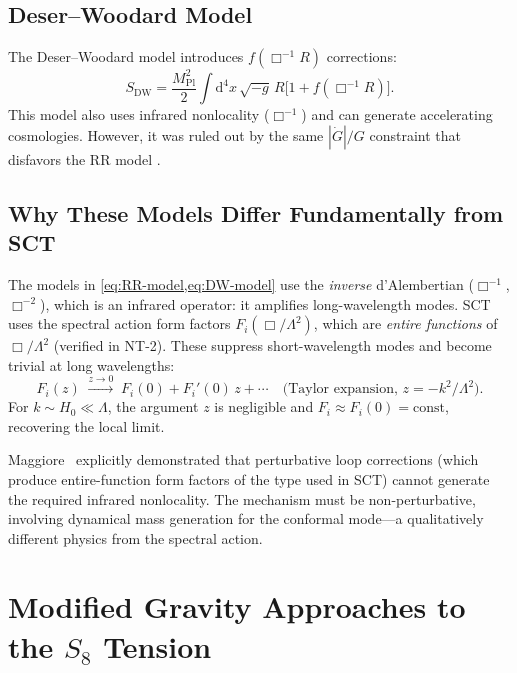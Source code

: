 \documentclass[11pt,a4paper]{article}
\theoremstyle{plain}
\theoremstyle{definition}
\theoremstyle{remark}
\renewcommand{\dd}{\mathrm{d}}
\begin{document}
\subsection{Deser--Woodard Model}

The Deser--Woodard model \cite{DeserWoodard07} introduces
$f(\Box^{-1} R)$ corrections:
\begin{equation}\label{eq:DW-model}
  S_{\mathrm{DW}} = \frac{M_{\mathrm{Pl}}^2}{2}
  \int \dd^4 x\,\sqrt{-g}\,
  R\bigl[1 + f(\Box^{-1} R)\bigr].
\end{equation}
This model also uses infrared nonlocality ($\Box^{-1}$) and can
generate accelerating cosmologies. However, it was ruled out by the
same $|\dot{G}|/G$ constraint that disfavors the RR model
\cite{Belgacem19LLR}.

\subsection{Why These Models Differ Fundamentally from SCT}

The models in \cref{eq:RR-model,eq:DW-model} use the \emph{inverse}
d'Alembertian ($\Box^{-1}$, $\Box^{-2}$), which is an infrared
operator: it amplifies long-wavelength modes. SCT uses the spectral
action form factors $F_i(\Box/\Lambda^2)$, which are \emph{entire
functions} of $\Box/\Lambda^2$ (verified in NT-2). These suppress
short-wavelength modes and become trivial at long wavelengths:
\begin{equation}
  F_i(z) \;\xrightarrow{z \to 0}\; F_i(0) + F_i'(0)\,z + \cdots
  \quad\text{(Taylor expansion, $z = -k^2/\Lambda^2$).}
\end{equation}
For $k \sim H_0 \ll \Lambda$, the argument $z$ is negligible and
$F_i \approx F_i(0) = \text{const}$, recovering the local limit.

Maggiore~\cite{Maggiore16} explicitly demonstrated that perturbative
loop corrections (which produce entire-function form factors of the
type used in SCT) cannot generate the required infrared nonlocality.
The mechanism must be non-perturbative, involving dynamical mass
generation for the conformal mode---a qualitatively different physics
from the spectral action.

\section{Modified Gravity Approaches to the $S_8$ Tension}
\label{sec:S8-approaches}
\end{document}
